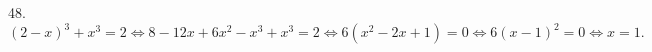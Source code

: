 48. $(2-x)^3+x^3=2\Leftrightarrow 8-12x+6x^2-x^3+x^3=2\Leftrightarrow 6(x^2-2x+1)=0\Leftrightarrow6(x-1)^2=0\Leftrightarrow x=1.$\\
